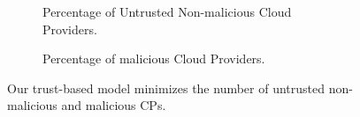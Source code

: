 \documentclass[preprint]{elsarticle}
\theoremstyle{definition}
\theoremstyle{remark}
\theoremstyle{property}
\begin{document}
\begin{figure}[!ht]
\centering
\begin{subfigure}{\textwidth}
\centering
{}
\caption{Percentage of Untrusted Non-malicious Cloud Providers.}
\end{subfigure}
\qquad\qquad
\begin{subfigure}{\textwidth}
\centering
{}
\caption{Percentage of malicious Cloud Providers.}
\end{subfigure}
\centering
\qquad\qquad
\caption{Our trust-based model minimizes the number of untrusted non-malicious and malicious CPs.}
\end{figure}
\end{document}
